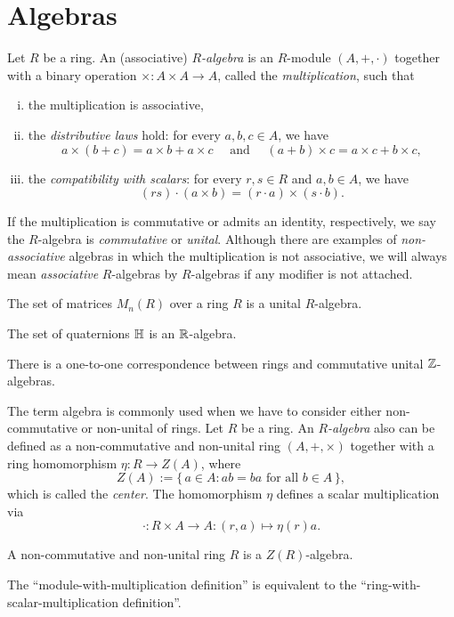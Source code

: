 \documentclass{../../large}
\begin{document}
\section{Algebras}
\begin{prb}
Let $R$ be a ring.
An (associative) \emph{$R$-algebra} is an $R$-module $(A,+,\cdot)$ together with a binary operation $\times:A\times A\to A$, called the \emph{multiplication}, such that
\begin{enumerate}[(i)]
\item the multiplication is associative,
\item the \emph{distributive laws} hold: for every $a,b,c\in A$, we have
\[a\times(b+c)=a\times b+a\times c\quad\text{ and }\quad(a+b)\times c=a\times c+b\times c,\]
\item the \emph{compatibility with scalars}: for every $r,s\in R$ and $a,b\in A$, we have
\[(rs)\cdot(a\times b)=(r\cdot a)\times(s\cdot b).\]
\end{enumerate}
If the multiplication is commutative or admits an identity, respectively, we say the $R$-algebra is \emph{commutative} or \emph{unital}.
Although there are examples of \emph{non-associative} algebras in which the multiplication is not associative, we will always mean \emph{associative} $R$-algebras by $R$-algebras if any modifier is not attached.
\begin{parts}
\item The set of matrices $M_n(R)$ over a ring $R$ is a unital $R$-algebra.
\item The set of quaternions $\mathbb{H}$ is an $\mathbb{R}$-algebra.
\item There is a one-to-one correspondence between rings and commutative unital $\mathbb{Z}$-algebras.
\end{parts}
\end{prb}


\begin{prb}
The term algebra is commonly used when we have to consider either non-commutative or non-unital of rings.
Let $R$ be a ring.
An \emph{$R$-algebra} also can be defined as a non-commutative and non-unital ring $(A,+,\times)$ together with a ring homomorphism $\eta:R\to Z(A)$, where
\[Z(A):=\{\,a\in A:ab=ba\text{ for all }b\in A\,\},\]
which is called the \emph{center}.
The homomorphism $\eta$ defines a scalar multiplication via
\[\cdot:R\times A\to A:(r,a)\mapsto\eta(r)a.\]
\begin{parts}
\item A non-commutative and non-unital ring $R$ is a $Z(R)$-algebra.
\item The ``module-with-multiplication definition'' is equivalent to the ``ring-with-scalar-multiplication definition''.
\end{parts}
\end{prb}
\end{document}

